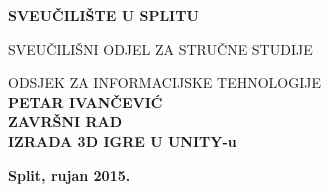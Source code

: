 \begin{center}
\thispagestyle{empty}

\begingroup
    \fontsize{14pt}{12pt}\selectfont\bfseries\center
 	SVEUČILIŠTE U SPLITU \par
	SVEUČILIŠNI ODJEL ZA STRUČNE STUDIJE \par
	ODSJEK ZA INFORMACIJSKE TEHNOLOGIJE
\endgroup\\[4cm]

{ \fontsize{18pt}{12pt}\selectfont\bfseries PETAR IVANČEVIĆ}\\[1cm]



{ \fontsize{14pt}{12pt}\selectfont\bfseries ZAVRŠNI RAD}\\[1cm]

{ \fontsize{21pt}{12pt}\selectfont\bfseries IZRADA 3D IGRE U UNITY-u}

\vfill
{ \fontsize{14pt}{12pt}\selectfont\bfseries Split, rujan 2015.}

\end{center}
